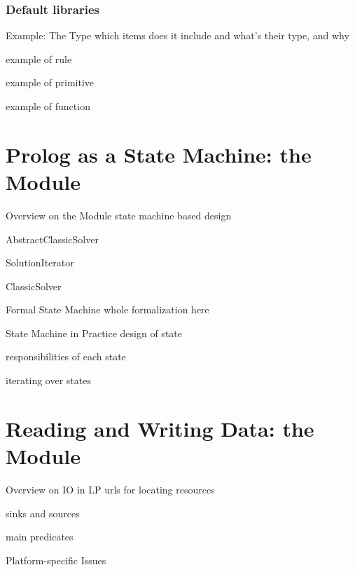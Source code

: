\documentclass[handout]{beamer}
\begin{document}
\subsubsection{Default libraries}

\begin{frame}[allowframebreaks]{Example: The  Type}
    which items does it include and what's their type, and why

    example of rule

    example of primitive

    example of function
\end{frame}

\section{Prolog as a State Machine: the  Module}

\begin{frame}[allowframebreaks]{Overview on the  Module}
    state machine based design

    AbstractClassicSolver

    SolutionIterator

    ClassicSolver
\end{frame}

\begin{frame}[allowframebreaks]{Formal State Machine}
    whole formalization here
\end{frame}

\begin{frame}[allowframebreaks]{State Machine in Practice}
    design of state

    responsibilities of each state

    iterating over states
\end{frame}

\section{Reading and Writing Data: the  Module}

\begin{frame}[allowframebreaks]{Overview on IO in LP}
    urls for locating resources

    sinks and sources

    main predicates
\end{frame}

\begin{frame}[allowframebreaks]{Platform-specific Issues}

\end{frame}
\end{document}

